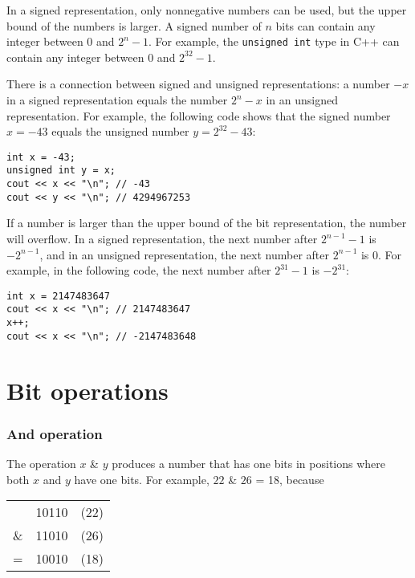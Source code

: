 In a signed representation, only nonnegative
numbers can be used, but the upper bound of the numbers is larger.
A signed number of $n$ bits can contain any
integer between $0$ and $2^n-1$.
For example, the \texttt{unsigned int} type in C++
can contain any integer between $0$ and $2^{32}-1$.

There is a connection between signed and unsigned
representations:
a number $-x$ in a signed representation
equals the number $2^n-x$ in an unsigned representation.
For example, the following code shows that
the signed number $x=-43$ equals the unsigned
number $y=2^{32}-43$:
\begin{lstlisting}
int x = -43;
unsigned int y = x;
cout << x << "\n"; // -43
cout << y << "\n"; // 4294967253
\end{lstlisting}

If a number is larger than the upper bound
of the bit representation, the number will overflow.
In a signed representation,
the next number after $2^{n-1}-1$ is $-2^{n-1}$,
and in an unsigned representation,
the next number after $2^{n-1}$ is $0$.
For example, in the following code,
the next number after $2^{31}-1$ is $-2^{31}$:
\begin{lstlisting}
int x = 2147483647
cout << x << "\n"; // 2147483647
x++;
cout << x << "\n"; // -2147483648
\end{lstlisting}

\section{Bit operations}

\newcommand\XOR{\mathbin{\char`\^}}

\subsubsection{And operation}


The  operation $x$ \& $y$ produces a number
that has one bits in positions where both
$x$ and $y$ have one bits.
For example, $22$ \& $26$ = 18, because

\begin{center}
\begin{tabular}{rrr}
& 10110 & (22)\\
\& & 11010 & (26) \\
\hline
 = & 10010 & (18) \\
\end{tabular}
\end{center}

